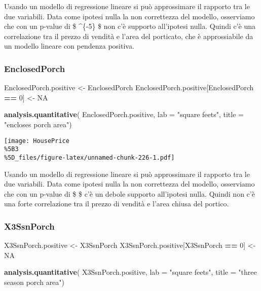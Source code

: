 \documentclass[
]{article}
\newenvironment{Shaded}{\begin{snugshade}}{\end{snugshade}}
\newcommand{\AttributeTok}[1]{\textcolor[rgb]{0.13,0.29,0.53}{#1}}
\newcommand{\ConstantTok}[1]{\textcolor[rgb]{0.56,0.35,0.01}{#1}}
\newcommand{\DecValTok}[1]{\textcolor[rgb]{0.00,0.00,0.81}{#1}}
\newcommand{\FunctionTok}[1]{\textcolor[rgb]{0.13,0.29,0.53}{\textbf{#1}}}
\newcommand{\NormalTok}[1]{#1}
\newcommand{\OtherTok}[1]{\textcolor[rgb]{0.56,0.35,0.01}{#1}}
\newcommand{\SpecialCharTok}[1]{\textcolor[rgb]{0.81,0.36,0.00}{\textbf{#1}}}
\newcommand{\StringTok}[1]{\textcolor[rgb]{0.31,0.60,0.02}{#1}}
\begin{document}
Usando un modello di regressione lineare si può approssimare il rapporto
tra le due variabili. Data come ipotesi nulla la non correttezza del
modello, osserviamo che con un p-value di \$ \^{}\{-5\} \$ non
c'è supporto all'ipotesi nulla. Quindi c'è una correlazione tra il
prezzo di vendità e l'area del porticato, che è approssiabile da un
modello lineare con pendenza positiva.

\subsubsection{EnclosedPorch}\label{enclosedporch-1}

\begin{Shaded}
\begin{Highlighting}[]
\NormalTok{EnclosedPorch.positive }\OtherTok{\textless{}{-}}\NormalTok{ EnclosedPorch}
\NormalTok{EnclosedPorch.positive[EnclosedPorch }\SpecialCharTok{==} \DecValTok{0}\NormalTok{] }\OtherTok{\textless{}{-}} \ConstantTok{NA}

\FunctionTok{analysis.quantitative}\NormalTok{(}
\NormalTok{    EnclosedPorch.positive,}
    \AttributeTok{lab =} \StringTok{"square feets"}\NormalTok{,}
    \AttributeTok{title =} \StringTok{"encloses porch area"}\NormalTok{)}
\end{Highlighting}
\end{Shaded}

\texttt{[image: HousePrice\\\%5B3\\\%5D\_files/figure-latex/unnamed-chunk-226-1.pdf]}

Usando un modello di regressione lineare si può approssimare il rapporto
tra le due variabili. Data come ipotesi nulla la non correttezza del
modello, osserviamo che con un p-value di \$  \$ c'è un
debole supporto all'ipotesi nulla. Quindi non c'è una forte correlazione
tra il prezzo di vendità e l'area chiusa del portico.

\subsubsection{X3SsnPorch}\label{x3ssnporch-1}

\begin{Shaded}
\begin{Highlighting}[]
\NormalTok{X3SsnPorch.positive }\OtherTok{\textless{}{-}}\NormalTok{ X3SsnPorch}
\NormalTok{X3SsnPorch.positive[X3SsnPorch }\SpecialCharTok{==} \DecValTok{0}\NormalTok{] }\OtherTok{\textless{}{-}} \ConstantTok{NA}

\FunctionTok{analysis.quantitative}\NormalTok{(}
\NormalTok{    X3SsnPorch.positive,}
    \AttributeTok{lab =} \StringTok{"square feets"}\NormalTok{,}
    \AttributeTok{title =} \StringTok{"three season porch area"}\NormalTok{)}
\end{Highlighting}
\end{Shaded}
\end{document}
